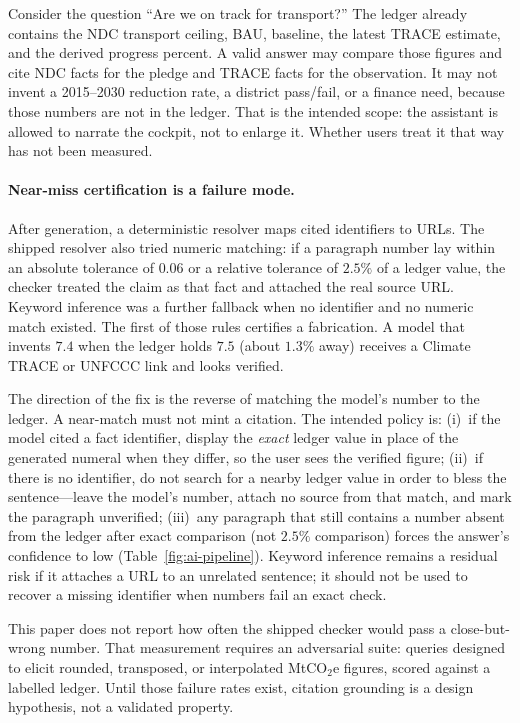 \documentclass{article}
\begin{document}
Consider the question ``Are we on track for transport?'' The ledger already contains the NDC transport ceiling, BAU, baseline, the latest TRACE estimate, and the derived progress percent. A valid answer may compare those figures and cite NDC facts for the pledge and TRACE facts for the observation. It may not invent a 2015--2030 reduction rate, a district pass/fail, or a finance need, because those numbers are not in the ledger. That is the intended scope: the assistant is allowed to narrate the cockpit, not to enlarge it. Whether users treat it that way has not been measured.

\paragraph{Near-miss certification is a failure mode.}
After generation, a deterministic resolver maps cited identifiers to URLs. The shipped resolver also tried numeric matching: if a paragraph number lay within an absolute tolerance of $0.06$ or a relative tolerance of $2.5\%$ of a ledger value, the checker treated the claim as that fact and attached the real source URL. Keyword inference was a further fallback when no identifier and no numeric match existed. The first of those rules certifies a fabrication. A model that invents $7.4$ when the ledger holds $7.5$ (about $1.3\%$ away) receives a Climate TRACE or UNFCCC link and looks verified.

The direction of the fix is the reverse of matching the model's number to the ledger. A near-match must not mint a citation. The intended policy is: (i)~if the model cited a fact identifier, display the \emph{exact} ledger value in place of the generated numeral when they differ, so the user sees the verified figure; (ii)~if there is no identifier, do not search for a nearby ledger value in order to bless the sentence---leave the model's number, attach no source from that match, and mark the paragraph unverified; (iii)~any paragraph that still contains a number absent from the ledger after exact comparison (not $2.5\%$ comparison) forces the answer's confidence to low (Table~\ref{fig:ai-pipeline}). Keyword inference remains a residual risk if it attaches a URL to an unrelated sentence; it should not be used to recover a missing identifier when numbers fail an exact check.

This paper does not report how often the shipped checker would pass a close-but-wrong number. That measurement requires an adversarial suite: queries designed to elicit rounded, transposed, or interpolated MtCO$_2$e figures, scored against a labelled ledger. Until those failure rates exist, citation grounding is a design hypothesis, not a validated property.
\end{document}
